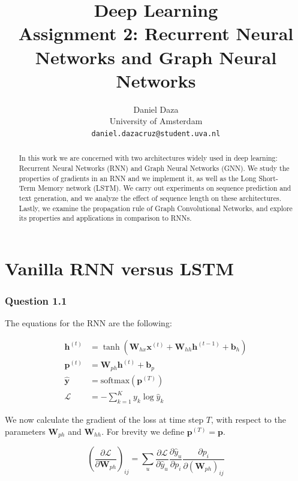 \documentclass{article}
\title{Deep Learning\\Assignment 2: Recurrent Neural Networks and Graph Neural Networks}
\author{%
  Daniel Daza\\
  University of Amsterdam\\
  \texttt{daniel.dazacruz@student.uva.nl} \\
}
\newcommand{\pd}[2]{\frac{\partial #1}{\partial #2}}
\begin{document}

\maketitle

\begin{abstract}
In this work we are concerned with two architectures widely used in deep learning: Recurrent Neural Networks (RNN) and Graph Neural Networks (GNN). We study the properties of gradients in an RNN and we implement it, as well as the Long Short-Term Memory network (LSTM). We carry out experiments on sequence prediction and text generation, and we analyze the effect of sequence length on these architectures. Lastly, we examine the propagation rule of Graph Convolutional Networks, and explore its properties and applications in comparison to RNNs.
\end{abstract}

\section{Vanilla RNN versus LSTM}

\subsubsection*{Question 1.1}

The equations for the RNN are the following:

\begin{align}
\mathbf{h}^{(t)} &= \tanh(\mathbf{W}_{hx}\mathbf{x}^{(t)} + \mathbf{W}_{hh}\mathbf{h}^{(t-1)} + \mathbf{b}_h) \label{eq:rnn1}\\
\mathbf{p}^{(t)} &= \mathbf{W}_{ph}\mathbf{h}^{(t)} + \mathbf{b}_p\\
\hat{\mathbf{y}} &= \text{softmax}(\mathbf{p}^{(T)}) \\
\mathcal{L} &= -\sum_{k=1}^K y_{k} \log\hat{y}_k \label{eq:rnn2}
\end{align}

We now calculate the gradient of the loss at time step $T$, with respect to the parameters $\mathbf{W}_{ph}$ and $\mathbf{W}_{hh}$. For brevity we define $\mathbf{p}^{(T)} = \mathbf{p}$.

\begin{equation}
\left(\pd{\mathcal{L}}{\mathbf{W}_{ph}}\right)_{ij} = \sum_u\pd{\mathcal{L}}{\hat{y}_u}\pd{\hat{y}_u}{p_i}\pd{p_i}{(\mathbf{W}_{ph})_{ij}}
\label{eq:dWph}
\end{equation}
\end{document}

